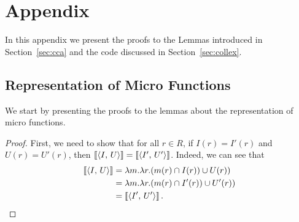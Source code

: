\section*{Appendix}
In this appendix we present the proofs to the Lemmas introduced in Section~\ref{sec:cca} and the code discussed in Section~\ref{sec:collex}.

\subsection*{Representation of Micro Functions}
We start by presenting the proofs to the lemmas about the representation of micro functions.

\equalEq*
\begin{proof}
   First, we need to show that for all $r\in R$, if $I(r)=I'(r)$ and $U(r)=U'(r)$, then $\left\llbracket\left\langle I,\,U\right\rangle\right\rrbracket=\left\llbracket\left\langle I',\,U'\right\rangle\right\rrbracket$. Indeed, we can see that
    \begin{align*}
        \left\llbracket\left\langle I,\,U\right\rangle\right\rrbracket
       & = \lambda m. \lambda r. (m(r) \cap I(r))\cup U(r))\\
       & = \lambda m. \lambda r. (m(r) \cap I'(r))\cup U'(r))\\
       & = 
        \left\llbracket\left\langle I',\,U'\right\rangle\right\rrbracket.
    \end{align*}


\end{proof}
